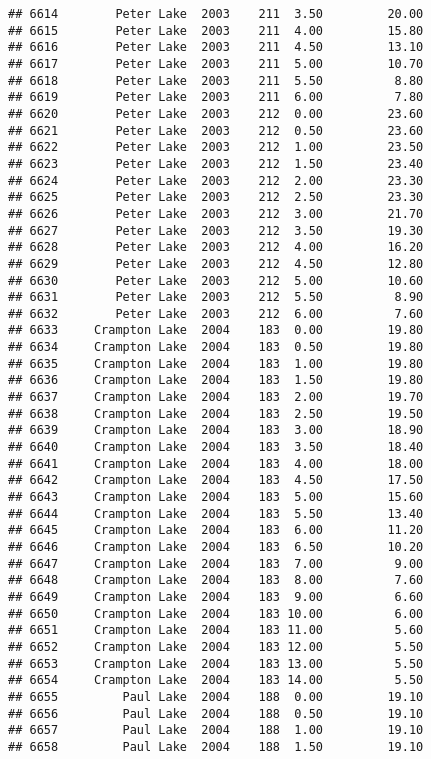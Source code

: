 \documentclass[
]{article}
\begin{document}
\begin{verbatim}
## 6614        Peter Lake  2003    211  3.50         20.00
## 6615        Peter Lake  2003    211  4.00         15.80
## 6616        Peter Lake  2003    211  4.50         13.10
## 6617        Peter Lake  2003    211  5.00         10.70
## 6618        Peter Lake  2003    211  5.50          8.80
## 6619        Peter Lake  2003    211  6.00          7.80
## 6620        Peter Lake  2003    212  0.00         23.60
## 6621        Peter Lake  2003    212  0.50         23.60
## 6622        Peter Lake  2003    212  1.00         23.50
## 6623        Peter Lake  2003    212  1.50         23.40
## 6624        Peter Lake  2003    212  2.00         23.30
## 6625        Peter Lake  2003    212  2.50         23.30
## 6626        Peter Lake  2003    212  3.00         21.70
## 6627        Peter Lake  2003    212  3.50         19.30
## 6628        Peter Lake  2003    212  4.00         16.20
## 6629        Peter Lake  2003    212  4.50         12.80
## 6630        Peter Lake  2003    212  5.00         10.60
## 6631        Peter Lake  2003    212  5.50          8.90
## 6632        Peter Lake  2003    212  6.00          7.60
## 6633     Crampton Lake  2004    183  0.00         19.80
## 6634     Crampton Lake  2004    183  0.50         19.80
## 6635     Crampton Lake  2004    183  1.00         19.80
## 6636     Crampton Lake  2004    183  1.50         19.80
## 6637     Crampton Lake  2004    183  2.00         19.70
## 6638     Crampton Lake  2004    183  2.50         19.50
## 6639     Crampton Lake  2004    183  3.00         18.90
## 6640     Crampton Lake  2004    183  3.50         18.40
## 6641     Crampton Lake  2004    183  4.00         18.00
## 6642     Crampton Lake  2004    183  4.50         17.50
## 6643     Crampton Lake  2004    183  5.00         15.60
## 6644     Crampton Lake  2004    183  5.50         13.40
## 6645     Crampton Lake  2004    183  6.00         11.20
## 6646     Crampton Lake  2004    183  6.50         10.20
## 6647     Crampton Lake  2004    183  7.00          9.00
## 6648     Crampton Lake  2004    183  8.00          7.60
## 6649     Crampton Lake  2004    183  9.00          6.60
## 6650     Crampton Lake  2004    183 10.00          6.00
## 6651     Crampton Lake  2004    183 11.00          5.60
## 6652     Crampton Lake  2004    183 12.00          5.50
## 6653     Crampton Lake  2004    183 13.00          5.50
## 6654     Crampton Lake  2004    183 14.00          5.50
## 6655         Paul Lake  2004    188  0.00         19.10
## 6656         Paul Lake  2004    188  0.50         19.10
## 6657         Paul Lake  2004    188  1.00         19.10
## 6658         Paul Lake  2004    188  1.50         19.10

\end{verbatim}
\end{document}
